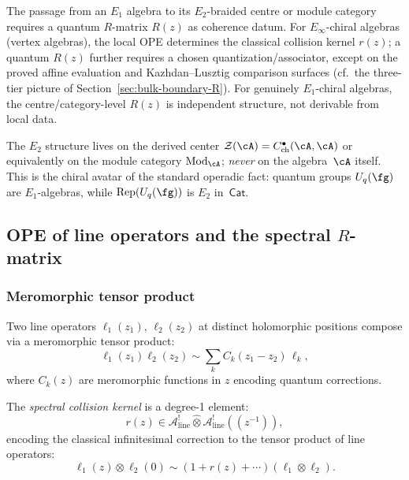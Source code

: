 \begin{remark}
\label{rem:E1-to-E2-locus}
The passage from an $E_1$ algebra to its $E_2$-braided centre or
module category requires a quantum $R$-matrix $R(z)$ as coherence
datum. For $E_\infty$-chiral algebras (vertex algebras),
the local OPE determines the classical collision kernel $r(z)$; a
quantum $R(z)$ further requires a chosen quantization/associator,
except on the proved affine evaluation and Kazhdan--Lusztig comparison
surfaces (cf.\ the three-tier picture of
Section~\textup{\ref{sec:bulk-boundary-R}}).
For genuinely $E_1$-chiral algebras, the centre/category-level
$R(z)$ is independent structure, not derivable from local data.

The $E_2$ structure lives on the derived center
$\mathcal{Z}(\cA) = C^\bullet_{\mathrm{ch}}(\cA,\cA)$
or equivalently on the module category
$\operatorname{Mod}_\cA$; \emph{never} on the algebra~$\cA$
itself. This is the chiral avatar of the standard operadic
fact: quantum groups $U_q(\fg)$ are $E_1$-algebras, while
$\operatorname{Rep}(U_q(\fg))$ is $E_2$ in~$\mathsf{Cat}$.
\end{remark}

\subsection{OPE of line operators and the spectral $R$-matrix}

\subsubsection{Meromorphic tensor product}

Two line operators $\ell_1(z_1)$, $\ell_2(z_2)$ at distinct holomorphic positions compose via a meromorphic tensor product:
\begin{equation}
\ell_1(z_1) \ell_2(z_2) \sim \sum_k C_k(z_1 - z_2) \, \ell_k,
\end{equation}
where $C_k(z)$ are meromorphic functions in $z$ encoding quantum corrections.

\begin{definition}
\label{def:spectral_R}
The \emph{spectral collision kernel} is a degree-1 element:
\begin{equation}
r(z) \in \mathcal{A}^!_{\mathrm{line}}
\widehat{\otimes}
\mathcal{A}^!_{\mathrm{line}}((z^{-1})),
\end{equation}
encoding the classical infinitesimal correction to the tensor product
of line operators:
\begin{equation}
\ell_1(z) \otimes \ell_2(0) \sim (1+r(z)+\cdots)(\ell_1 \otimes \ell_2).
\end{equation}
\end{definition}

